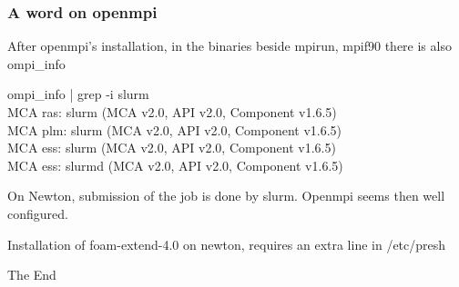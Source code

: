 \documentclass{beamer}
\begin{document}
\begin{frame}
\frametitle{A word on openmpi}

After openmpi's installation, in the binaries beside mpirun, mpif90 there is also ompi\_info

ompi\_info | grep -i slurm \\
MCA ras: slurm (MCA v2.0, API v2.0, Component v1.6.5) \\
MCA plm: slurm (MCA v2.0, API v2.0, Component v1.6.5) \\ 
MCA ess: slurm (MCA v2.0, API v2.0, Component v1.6.5) \\
MCA ess: slurmd (MCA v2.0, API v2.0, Component v1.6.5) 

On Newton, submission of the job is done by slurm. Openmpi seems then well configured.

Installation of foam-extend-4.0 on newton, requires an extra line in /etc/presh

\end{frame}


\begin{frame}
\Huge{\centerline{The End}}
\end{frame}

\end{document}
